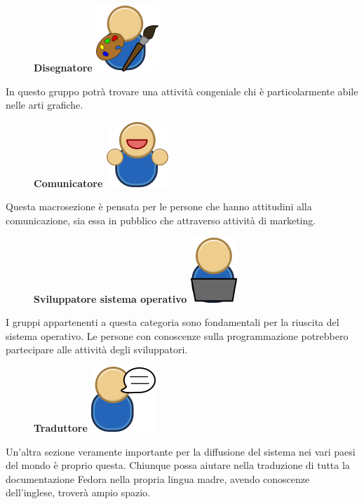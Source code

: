 \begin{figure}[!hp]
\centering
{\bfseries Disegnatore \includegraphics[scale=.30]{articoli/varie/immagini/join-designer.png}}
\end{figure}
In questo gruppo potrà trovare una attività congeniale chi è particolarmente abile nelle arti grafiche.\\

\begin{figure}[!h]
\centering
{\bfseries Comunicatore \includegraphics[scale=.30]{articoli/varie/immagini/join-people.png}}
\end{figure}
Questa macrosezione è pensata per le persone che hanno attitudini alla comunicazione, sia essa in pubblico che attraverso attività di marketing.\\

\begin{figure}[!h]
\centering
{\bfseries Sviluppatore sistema operativo \includegraphics[scale=.30]{articoli/varie/immagini/join-osdevel.png}}
\end{figure}
I gruppi appartenenti a questa categoria sono fondamentali per la riuscita del sistema operativo. Le persone con conoscenze sulla programmazione potrebbero partecipare alle attività degli sviluppatori.\\

\begin{figure}[!h]
\centering
{\bfseries Traduttore \includegraphics[scale=.30]{articoli/varie/immagini/join-translator.png}}
\end{figure}
Un'altra sezione veramente importante per la diffusione del sistema nei vari paesi del mondo è proprio questa. Chiunque possa aiutare nella traduzione di tutta la documentazione Fedora nella propria lingua madre, avendo conoscenze dell'inglese, troverà ampio spazio.\\


